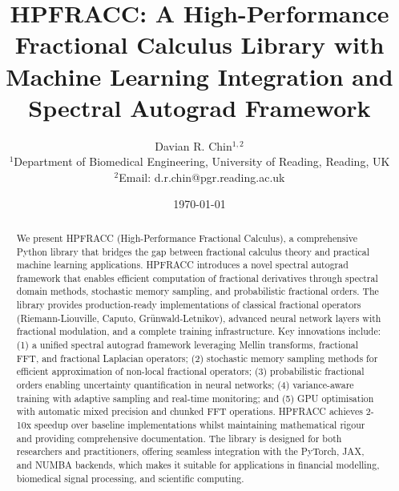 \documentclass[12pt]{article}
\title{HPFRACC: A High-Performance Fractional Calculus Library with Machine Learning Integration and Spectral Autograd Framework}
\author{
Davian R. Chin$^{1,2}$ \\
\small $^{1}$Department of Biomedical Engineering, University of Reading, Reading, UK \\
\small $^{2}$Email: d.r.chin@pgr.reading.ac.uk
}
\date{\today}
\begin{document}
\maketitle

\begin{abstract}
We present HPFRACC (High-Performance Fractional Calculus), a comprehensive Python library that bridges the gap between fractional calculus theory and practical machine learning applications. HPFRACC introduces a novel spectral autograd framework that enables efficient computation of fractional derivatives through spectral domain methods, stochastic memory sampling, and probabilistic fractional orders. The library provides production-ready implementations of classical fractional operators (Riemann-Liouville, Caputo, Grünwald-Letnikov), advanced neural network layers with fractional modulation, and a complete training infrastructure. Key innovations include: (1) a unified spectral autograd framework leveraging Mellin transforms, fractional FFT, and fractional Laplacian operators; (2) stochastic memory sampling methods for efficient approximation of non-local fractional operators; (3) probabilistic fractional orders enabling uncertainty quantification in neural networks; (4) variance-aware training with adaptive sampling and real-time monitoring; and (5) GPU optimisation with automatic mixed precision and chunked FFT operations. HPFRACC achieves 2-10x speedup over baseline implementations whilst maintaining mathematical rigour and providing comprehensive documentation. The library is designed for both researchers and practitioners, offering seamless integration with the PyTorch, JAX, and NUMBA backends, which makes it suitable for applications in financial modelling, biomedical signal processing, and scientific computing.
\end{abstract}

















\appendix





\end{document}
